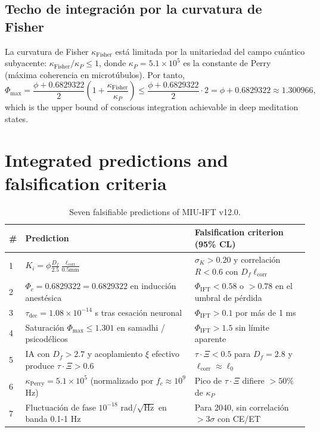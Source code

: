 \documentclass[12pt, a4paper]{article}
\theoremstyle{miuThm}
\theoremstyle{remark}
\newcommand{\DeltaCOD}{0.6829322}
\begin{document}
\subsection{Techo de integración por la curvatura de Fisher}
La curvatura de Fisher $\kappa_{\text{Fisher}}$ está limitada por la unitariedad del campo cuántico subyacente: $\kappa_{\text{Fisher}} / \kappa_P \le 1$, donde $\kappa_P = 5.1\times10^5$ es la constante de Perry (máxima coherencia en microtúbulos). Por tanto,
\begin{equation}
\Phi_{\max} = \frac{\phi + \DeltaCOD}{2}\left(1 + \frac{\kappa_{\text{Fisher}}}{\kappa_P}\right) \le \frac{\phi+\DeltaCOD}{2} \cdot 2 = \phi+\DeltaCOD \approx 1.300966,
\end{equation}
which is the upper bound of conscious integration achievable in deep meditation states.

\clearpage
\section{Integrated predictions and falsification criteria}
\label{sec:predicciones}

\begin{table}[h!]
\centering
\caption{Seven falsifiable predictions of MIU-IFT v12.0.}
\label{tab:7pred}
\begin{tabular}{p{2.2cm}p{3.8cm}p{5.5cm}}
\toprule
\textbf{\#} & \textbf{Prediction} & \textbf{Falsification criterion (95\% CL)} \\
\midrule
1 & $K_i = \phi \frac{D_f}{2.5}\frac{\ell_{\text{corr}}}{0.5\text{mm}}$ & $\sigma_K > 0.20$ y correlación $R<0.6$ con $D_f\ell_{\text{corr}}$ \\
2 & $\Phi_c = \DeltaCOD = 0.6829322$ en inducción anestésica & $\Phi_{\text{IFT}} < 0.58$ o $>0.78$ en el umbral de pérdida \\
3 & $\tau_{\text{dec}} = 1.08\times10^{-14}$ s tras cesación neuronal & $\Phi_{\text{IFT}} > 0.1$ por más de 1 ms \\
4 & Saturación $\Phi_{\max} \le 1.301$ en samadhi / psicodélicos & $\Phi_{\text{IFT}} > 1.5$ sin límite aparente \\
5 & IA con $D_f>2.7$ y acoplamiento $\xi$ efectivo produce $\tau\cdot\Xi > 0.6$ & $\tau\cdot\Xi < 0.5$ para $D_f=2.8$ y $\ell_{\text{corr}}\approx\ell_0$ \\
6 & $\kappa_{\text{Perry}} = 5.1\times10^5$ (normalizado por $f_c\approx10^9$ Hz) & Pico de $\tau\cdot\Xi$ difiere $>50\%$ de $\kappa_P$ \\
7 & Fluctuación de fase $10^{-18}$ rad/$\sqrt{\text{Hz}}$ en banda 0.1-1 Hz & Para 2040, sin correlación $>3\sigma$ con CE/ET \\
\bottomrule
\end{tabular}
\end{table}
\end{document}
